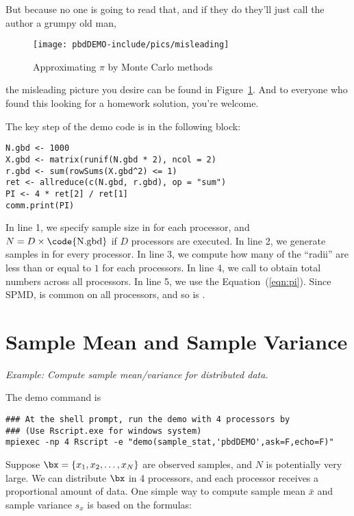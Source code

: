 But because no one is going to read that, and if they do they'll just call the
author a grumpy old man,
\begin{figure}[h]
\centering
 \texttt{[image: pbdDEMO-include/pics/misleading]}
 \caption[Approximating $\pi$]{Approximating $\pi$ by Monte Carlo methods}\label{pic:dumb}
\end{figure}
the misleading picture you desire can be found in Figure~\ref{pic:dumb}.
And to everyone who found this looking for a homework solution, you're welcome.

The key step of the demo code is in the following block:
\begin{lstlisting}[language=rr,title=R Code]
N.gbd <- 1000
X.gbd <- matrix(runif(N.gbd * 2), ncol = 2)
r.gbd <- sum(rowSums(X.gbd^2) <= 1)
ret <- allreduce(c(N.gbd, r.gbd), op = "sum")
PI <- 4 * ret[2] / ret[1]
comm.print(PI)
\end{lstlisting}

In line 1, we specify sample size in  for each processor,
and $N=D\times\mbox{\code{N.gbd}}$ if $D$ processors are executed.
In line 2, we generate samples in  for every processor.
In line 3, we compute how many of the ``radii'' are less than or equal to $1$
for each processors.
In line 4, we call 
to obtain total numbers across all processors.
In line 5, we use the Equation~(\ref{eqn:pi}).
Since SPMD,  is common on all processors, and so is .





\section[Sample Mean and Sample Variance]{Sample Mean and Sample Variance}%
\label{sec:sample_stat}

\emph{Example:  Compute sample mean/variance for distributed data.}

The demo command is
\begin{lstlisting}
### At the shell prompt, run the demo with 4 processors by
### (Use Rscript.exe for windows system)
mpiexec -np 4 Rscript -e "demo(sample_stat,'pbdDEMO',ask=F,echo=F)"
\end{lstlisting}

Suppose $\bx = \{x_1, x_2, \ldots, x_N\}$
are observed samples, and $N$ is potentially very large.
We can distribute $\bx$ in 4 processors, and each processor receives a
proportional amount of data. One simple way to compute sample
mean $\bar{x}$ and
sample variance $s_x$ is based on the formulas:

